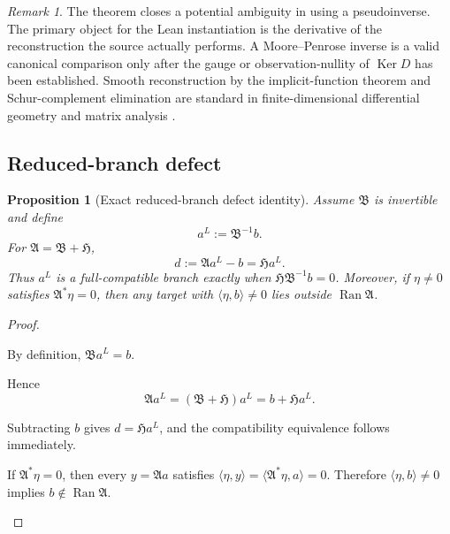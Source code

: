 \documentclass[12pt]{article}
\theoremstyle{plain}
\newtheorem{proposition}[theorem]{Proposition}
\theoremstyle{definition}
\theoremstyle{remark}
\newtheorem{remark}[theorem]{Remark}
\newcommand{\Ran}{\operatorname{Ran}}
\newcommand{\Ker}{\operatorname{Ker}}
\newcommand{\Comp}{\mathfrak A}
\newcommand{\Red}{\mathfrak B}
\newcommand{\Hidden}{\mathfrak H}
\begin{document}
\begin{remark}
The theorem closes a potential ambiguity in using a pseudoinverse. The primary object for the Lean instantiation is the derivative of the reconstruction the source actually performs. A Moore--Penrose inverse is a valid canonical comparison only after the gauge or observation-nullity of \(\Ker D\) has been established. Smooth reconstruction by the implicit-function theorem and Schur-complement elimination are standard in finite-dimensional differential geometry and matrix analysis \cite{Lee2012,Zhang2005}.
\end{remark}

\subsection{Reduced-branch defect}
\begin{proposition}[Exact reduced-branch defect identity]\label{prop:defect}
Assume \(\Red\) is invertible and define
\[
a^L:=\Red^{-1}b.
\]
For \(\Comp=\Red+\Hidden\),
\[
\boxed{d:=\Comp a^L-b=\Hidden a^L.}
\]
Thus \(a^L\) is a full-compatible branch exactly when \(\Hidden\Red^{-1}b=0\). Moreover, if \(\eta\neq0\) satisfies \(\Comp^*\eta=0\), then any target with \(\langle\eta,b\rangle\neq0\) lies outside \(\Ran\Comp\).
\end{proposition}

\begin{proof}
\begin{prooflines}
\item By definition, \(\Red a^L=b\).
\item Hence
\[
\Comp a^L=(\Red+\Hidden)a^L=b+\Hidden a^L.
\]
\item Subtracting \(b\) gives \(d=\Hidden a^L\), and the compatibility equivalence follows immediately.
\item If \(\Comp^*\eta=0\), then every \(y=\Comp a\) satisfies \(\langle\eta,y\rangle=\langle\Comp^*\eta,a\rangle=0\). Therefore \(\langle\eta,b\rangle\neq0\) implies \(b\notin\Ran\Comp\).
\end{prooflines}
\end{proof}
\end{document}
